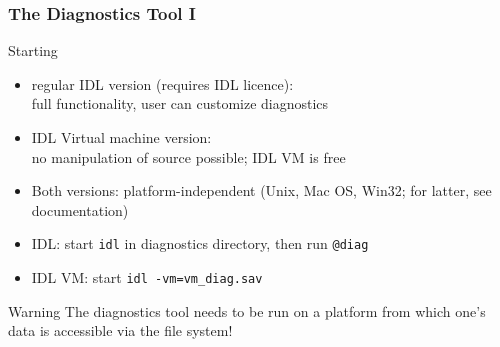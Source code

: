 \documentclass[9pt]{beamer}
\begin{document}

\begin{frame}[fragile]
  \frametitle{The Diagnostics Tool I}

\begin{block}{Starting}

\begin{itemize}
\item regular IDL version (requires IDL licence):\\
full functionality, user can customize diagnostics
\item IDL Virtual machine version:\\
no manipulation of source possible; IDL VM is free
\item Both versions: platform-independent (Unix, Mac OS, Win32; for latter, see documentation)
\end{itemize}

\vspace{0.2cm}

\begin{itemize}
\item IDL: start \verb|idl| in diagnostics directory, then run \verb|@diag|
\item IDL VM: start \verb|idl -vm=vm_diag.sav|
\end{itemize}

\begin{alertblock}{Warning}
The diagnostics tool needs to be run on a platform from which one's data is accessible via
the file system!
\end{alertblock}

\end{block}

\end{frame}

\end{document}
